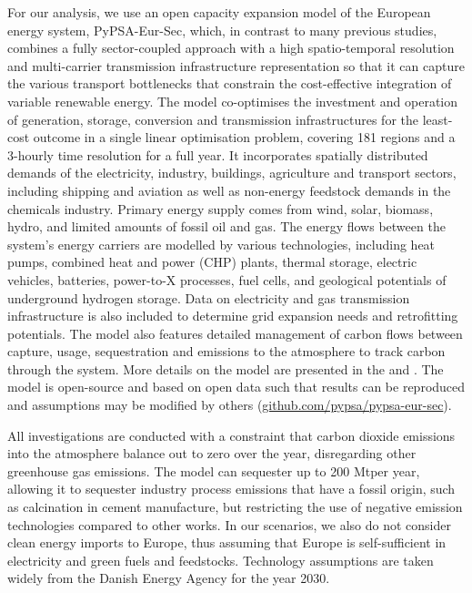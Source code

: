 For our analysis, we use an open capacity expansion model of the European energy
system, PyPSA-Eur-Sec, which, in contrast to many previous studies,
\cite{henningComprehensiveModel2014,mathiesenSmartEnergy2015,connollySmartEnergy2016,lofflerDesigningModel2017,blancoPotentialHydrogen2018,brownSynergiesSector2018,in-depth_2018,victoria2020}
combines a fully sector-coupled approach with a high spatio-temporal resolution
and multi-carrier transmission infrastructure representation so that it can
capture the various transport bottlenecks that constrain the cost-effective
integration of variable renewable energy. The model co-optimises the investment
and operation of generation, storage, conversion and transmission
infrastructures for the least-cost outcome in a single linear optimisation
problem, covering 181 regions and a 3-hourly time resolution for a full year. It
incorporates spatially distributed demands of the electricity, industry,
buildings, agriculture and transport sectors, including shipping and aviation as
well as non-energy feedstock demands in the chemicals industry. Primary energy
supply comes from wind, solar, biomass, hydro, and limited amounts of fossil oil
and gas. The energy flows between the system's energy carriers are modelled by
various technologies, including heat pumps, combined heat and power (CHP)
plants, thermal storage, electric vehicles, batteries, power-to-X processes,
fuel cells, and geological potentials of underground hydrogen storage. Data on
electricity and gas transmission infrastructure is also included to determine
grid expansion needs and retrofitting potentials. The model also features
detailed management of carbon flows between capture, usage, sequestration and
emissions to the atmosphere to track carbon through the system. More details on
the model are presented in the  and . The
model is open-source and based on open data such that results can be reproduced
and assumptions may be modified by others
(\href{https://github.com/pypsa/pypsa-eur-sec}{github.com/pypsa/pypsa-eur-sec}).

All investigations are conducted with a constraint that carbon dioxide emissions
into the atmosphere balance out to zero over the year, disregarding other
greenhouse gas emissions. The model can sequester up to 200 Mt\co per year,
allowing it to sequester industry process emissions that have a fossil origin,
such as calcination in cement manufacture, but restricting the use of negative
emission technologies compared to other works.
\cite{blancoPotentialHydrogen2018} In our scenarios, we also do not consider
clean energy imports to Europe, thus assuming that Europe is self-sufficient in
electricity and green fuels and feedstocks. Technology assumptions are taken
widely from the Danish Energy Agency for the year 2030. \cite{DEA}

